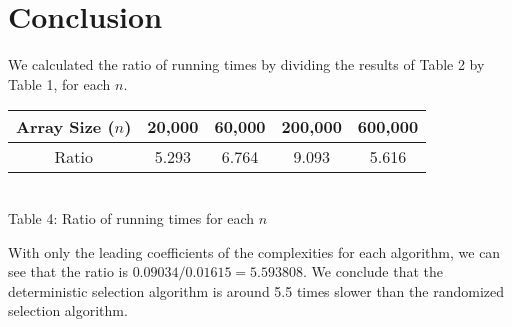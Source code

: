 \documentclass[12pt]{article}
\begin{document}
\section{Conclusion}
We calculated the ratio of running times by dividing the results of Table 2 by Table 1, for each $n$.
\begin{center}
	\begin{tabular}{|c|c|c|c|c|}
		\hline
		Array Size ($n$) & 20,000 & 60,000 & 200,000 & 600,000 \\\hline
		Ratio & 5.293 & 6.764 & 9.093 & 5.616 \\ \hline
	\end{tabular}\\\vspace{0.5em}
	{\small Table 4: Ratio of running times for each $n$}
\end{center}
With only the leading coefficients of the complexities for each algorithm, we can see that the ratio is $0.09034 / 0.01615 = 5.593808$. We conclude that the deterministic selection algorithm is around 5.5 times slower than the randomized selection algorithm.
\end{document}
